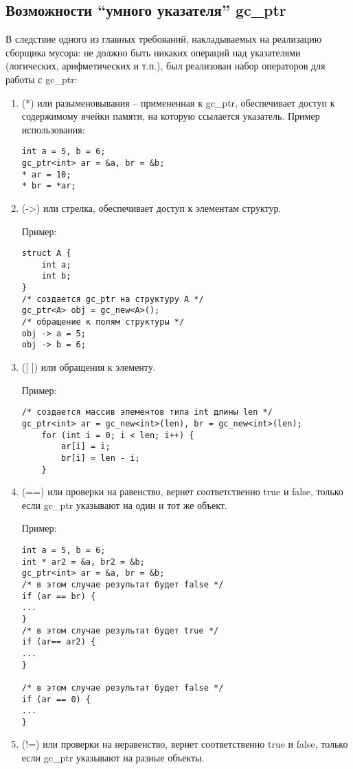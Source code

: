 \subsection {Возможности ``умного указателя'' gc\_ptr}
В следствие одного из главных требований, накладываемых на реализацию сборщика мусора:  не должно быть никаких операций над указателями (логических, арифметических и т.п.), был реализован набор операторов для работы с gc\_ptr:

\begin{enumerate}
\item (*) или разыменовывания -- примененная к gc\_ptr, обеспечивает доступ к содержимому ячейки памяти, на которую ссылается указатель. 
Пример использования:
\begin{lstlisting}
int a = 5, b = 6;
gc_ptr<int> ar = &a, br = &b;
* ar = 10;
* br = *ar;
\end{lstlisting}

\item  (->) или стрелка, обеспечивает доступ к элементам структур.

Пример:
\begin{lstlisting}
struct A {
	int a;
	int b;
}
/* создается gc_ptr на структуру A */
gc_ptr<A> obj = gc_new<A>();
/* обращение к полям структуры */
obj -> a = 5;
obj -> b = 6;
\end{lstlisting}

\item ([ ]) или обращения к элементу. 

Пример:
\begin{lstlisting}
/* создается массив элементов типа int длины len */
gc_ptr<int> ar = gc_new<int>(len), br = gc_new<int>(len);
	for (int i = 0; i < len; i++) {
		ar[i] = i;
		br[i] = len - i;
	}
\end{lstlisting}

\item (==) или проверки на равенство, вернет соответственно true и false, только если gc\_ptr указывают на один и тот же объект. 

Пример:
\begin{lstlisting}
int a = 5, b = 6;
int * ar2 = &a, br2 = &b;
gc_ptr<int> ar = &a, br = &b;
/* в этом случае результат будет false */
if (ar == br) {
...	
}
/* в этом случае результат будет true */
if (ar== ar2) {
...
}

/* в этом случае результат будет false */
if (ar == 0) {
...
}
\end{lstlisting}

\item (!=) или проверки на неравенство, вернет соответственно true и false, только если gc\_ptr указывают на разные объекты. 


\end{enumerate}

